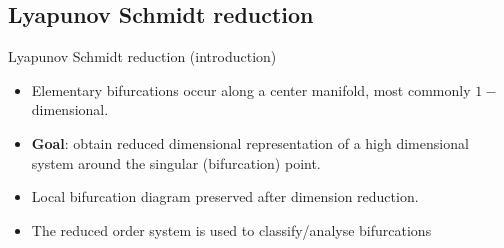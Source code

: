 \documentclass[11pt]{beamer}
\begin{document}
\begin{frame}{\section{Lyapunov Schmidt reduction}Lyapunov Schmidt reduction (introduction)}
    \begin{itemize}
        \itemsep2em
        \item Elementary bifurcations occur along a \alert{center manifold}, most commonly \(1-\)dimensional.
        \item \textbf{Goal}: obtain \alert{reduced dimensional} representation of a high dimensional system around the singular (bifurcation) point.
        \item Local bifurcation diagram preserved after dimension reduction. %
        \item The reduced order system is used to classify/analyse bifurcations
    \end{itemize}
\end{frame}
\end{document}
